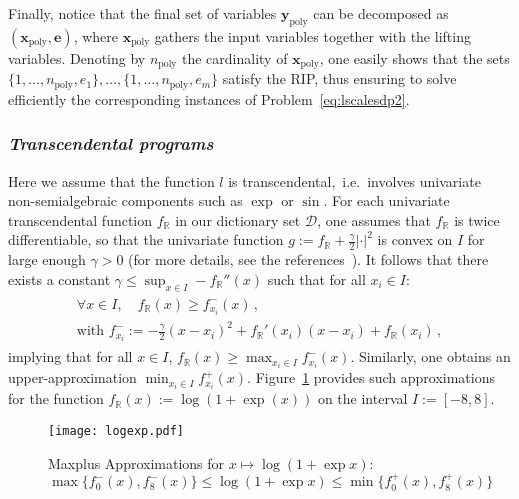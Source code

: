 \documentclass[preprint]{sigplanconf}
\newcommand{\setD}{\mathcal{D}} %
\newcommand{\R}{\mathbb{R}}
\newcommand{\x}{\mathbf{x}}
\newcommand{\e}{\mathbf{e}}
\newcommand{\y}{\mathbf{y}}
\newcommand{\poly}{_\text{poly}}
\theoremstyle{plain}
\begin{document}
Finally, notice that the final set of variables $\y\poly$ can be decomposed as $(\x\poly, \e)$, where $\x\poly$ gathers the input variables together with the lifting variables.  
Denoting by $n\poly$ the cardinality of $\x\poly$, one easily shows that the sets $\{1, \dots, n\poly, e_1\},\dots,\{1, \dots, n\poly, e_m\}$ satisfy the RIP, thus ensuring to solve efficiently the corresponding instances of Problem~\eqref{eq:lscalesdp2}.
%
\subsubsection*{\textit{Transcendental programs}}
Here we assume that the function $l$ is transcendental,~i.e.~involves univariate non-semialgebraic components such as $\exp$ or $\sin$. For each univariate transcendental function $f_{\R}$ in our dictionary set $\setD$, one assumes that $f_{\R}$ is twice differentiable, so that the univariate function $g := f_{\R} + \frac{\gamma}{2} |\cdot|^2$ is convex on $I$ for large enough $\gamma > 0$ (for more details, see the references~\cite{agk04, mceneaney-livre}). It follows that there exists a constant $\gamma \leq \sup_{x\in I} -f_{\R}''(x)$ such that for all $x_i \in I$:
\begin{align}
\begin{split}
\label{eq:maxplus}
\forall x \in I, \quad f_{\R} (x)  \geq f_{x_i}^-(x) \,,\\
\text{with } f_{x_i}^- :=  -\frac{\gamma}{2} (x-x_i)^2 +f_{\R}'(x_i) (x - x_i) + f_{\R} (x_i) \,,
\end{split}
\end{align}
implying that for all $x \in I$, $f_{\R} (x)  \geq \max_{x_i \in I} f_{x_i}^-(x)$. Similarly, one obtains an upper-approximation $\min_{x_i \in I} f_{x_i}^+(x)$.
Figure~\ref{fig:logexp} provides such approximations for the function $f_{\R}(x) := \log (1 + \exp(x))$ on the interval $I := [-8, 8]$.
%
\begin{figure}[!ht]
\begin{center}
\texttt{[image: logexp.pdf]}
\caption{Maxplus Approximations for $x \mapsto \log(1 + \exp{x})$: $\max \{ f_0^- (x), f_8^- (x)\} \leq  \log(1 + \exp{x}) \leq \min \{ f_0^+ (x), f_8^+ (x)\} $}\label{fig:logexp}
\end{center}
\end{figure}
%
\end{document}
